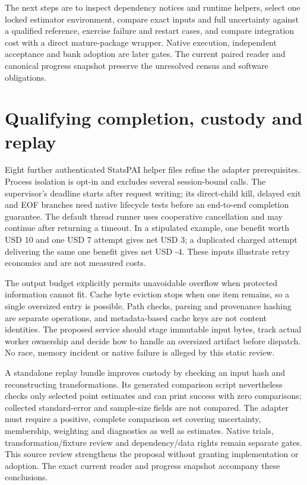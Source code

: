 The next steps are to inspect dependency notices and runtime helpers,
select one locked estimator environment, compare exact inputs and full
uncertainty against a qualified reference, exercise failure and restart
cases, and compare integration cost with a direct mature-package
wrapper. Native execution, independent acceptance and bank adoption are
later gates. The current paired reader and canonical progress snapshot
preserve the unresolved census and software obligations.
\citep{sp23contract_reader,sp23contract_progress}

\hypertarget{qualifying-completion-custody-and-replay}{%
\section{Qualifying completion, custody and
replay}\label{qualifying-completion-custody-and-replay}}

Eight further authenticated StatsPAI helper files refine the adapter
prerequisites. Process isolation is opt-in and excludes several
session-bound calls. The supervisor's deadline starts after request
writing; its direct-child kill, delayed exit and EOF branches need
native lifecycle tests before an end-to-end completion guarantee. The
default thread runner uses cooperative cancellation and may continue
after returning a timeout. In a stipulated example, one benefit worth
USD 10 and one USD 7 attempt gives net USD 3; a duplicated charged
attempt delivering the same one benefit gives net USD -4. These inputs
illustrate retry economics and are not measured costs.
\citep{exec23_statspai_runtime,exec23_statspai_runtime_reference}

The output budget explicitly permits unavoidable overflow when protected
information cannot fit. Cache byte eviction stops when one item remains,
so a single oversized entry is possible. Path checks, parsing and
provenance hashing are separate operations, and metadata-based cache
keys are not content identities. The proposed service should stage
immutable input bytes, track actual worker ownership and decide how to
handle an oversized artifact before dispatch. No race, memory incident
or native failure is alleged by this static review.
\citep{exec23_statspai_runtime,exec23_statspai_runtime_reference}

A standalone replay bundle improves custody by checking an input hash
and reconstructing transformations. Its generated comparison script
nevertheless checks only selected point estimates and can print success
with zero comparisons; collected standard-error and sample-size fields
are not compared. The adapter must require a positive, complete
comparison set covering uncertainty, membership, weighting and
diagnostics as well as estimates. Native trials, transformation/fixture
review and dependency/data rights remain separate gates. This source
review strengthens the proposal without granting implementation or
adoption. The exact current reader and progress snapshot accompany these
conclusions.
\citep{exec23_statspai_runtime,exec23_statspai_runtime_reference,sp23runtime_reader,sp23runtime_progress}

